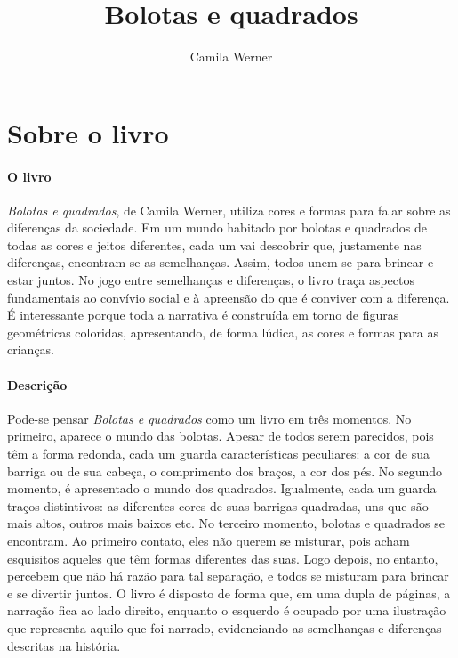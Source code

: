 \documentclass[11pt]{extarticle}
\newcommand{\AutorLivro}{Camila Werner}
\newcommand{\TituloLivro}{Bolotas e quadrados}
\newcommand{\colaborador}{Paulo Pompermaier e Renier Silva}
\begin{document}
\title{\TituloLivro}
\author{\AutorLivro}
\def\authornotes{\colaborador}

\date{}
\maketitle


\tableofcontents



\section{Sobre o livro}

\paragraph{O livro} \textit{Bolotas e quadrados}, de Camila Werner, utiliza cores e formas para falar sobre as diferenças da sociedade. Em um mundo habitado por bolotas e quadrados de todas as cores e jeitos diferentes, cada um vai descobrir que, justamente nas diferenças, encontram-se as semelhanças. Assim, todos unem-se para brincar e estar juntos. No jogo entre semelhanças e diferenças, o livro traça aspectos fundamentais ao convívio social e à apreensão do que é conviver com a diferença. É interessante porque toda a narrativa é construída em torno de figuras geométricas coloridas, apresentando, de forma lúdica, as cores e formas para as crianças. 


\paragraph{Descrição} Pode-se pensar \textit{Bolotas e quadrados} como um livro em três momentos. No primeiro, aparece o mundo das bolotas. Apesar de todos serem parecidos, pois têm a forma redonda, cada um guarda características peculiares: a cor de sua barriga ou de sua cabeça, o comprimento dos braços, a cor dos pés. No segundo momento, é apresentado o mundo dos quadrados. Igualmente, cada um guarda traços distintivos: as diferentes cores de suas barrigas quadradas, uns que são mais altos, outros mais baixos etc.
No terceiro momento, bolotas e quadrados se encontram. Ao primeiro contato, eles não querem se misturar, pois acham esquisitos aqueles que têm formas diferentes das suas. Logo depois, no entanto, percebem que não há razão para tal separação, e todos se misturam para brincar e se divertir juntos. O livro é disposto de forma que, em uma dupla de páginas, a narração fica ao lado direito, enquanto o esquerdo é ocupado por uma ilustração que representa aquilo que foi narrado, evidenciando as semelhanças e diferenças descritas na história.
\end{document}
